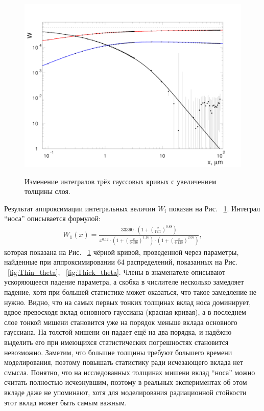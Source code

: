 \documentclass[a4paper,12pt]{article}
\begin{document}
\begin{large}
  \begin{figure}[ht]
    {
       \includegraphics[width=0.99\linewidth]{images/pars135}
    }
    \caption{Изменение интегралов трёх гауссовых кривых с увеличением толщины слоя.}
    \label{fig:Par1theta}
  \end{figure}

  Результат аппроксимации интегральных величин $W_i$ показан на Рис. ~\ref{fig:Par1theta}.
  Интеграл ``носа'' описывается формулой:
\begin{equation}
\label{MSApproximationW1}
\begin{aligned} 
W_1(x)= \frac{33390\cdot (1+\left(\frac{x}{17.1}\right)^{0.88})}{x^{0.12} \cdot \left(1+\left(\frac{x}{0.636}\right)^{1.16}\right) \cdot \left(1+\left(\frac{x}{6.128}\right)^{2.05}\right)},
\end{aligned}
\end{equation}
  которая показана на Рис. ~\ref{fig:Par1theta} чёрной кривой, проведенной через параметры, найденные при аппроксимировании 64 распределений, показанных на Рис. ~\ref{fig:Thin_theta}, ~\ref{fig:Thick_theta}.
  Члены в знаменателе описывают ускоряющееся падение параметра, а скобка в числителе несколько замедляет падение, хотя при большей статистике может оказаться, что такое замедление не нужно.
  Видно, что на самых первых тонких толщинах вклад носа доминирует, вдвое превосходя вклад основного гауссиана (красная кривая), а в последнем слое тонкой мишени становится уже на порядок меньше вклада основного гауссиана.
  На толстой мишени он падает ещё на два порядка, и надёжно выделить его при имеющихся статистических погрешностях становится невозможно.
  Заметим, что большие толщины требуют большего времени моделирования, поэтому повышать статистику ради исчезающего вклада нет смысла.
  Понятно, что на исследованных толщинах мишени вклад ``носа'' можно считать полностью исчезнувшим, поэтому в реальных экспериментах об этом вкладе даже не упоминают, хотя для моделирования радиационной стойкости этот вклад может быть самым важным.


\end{large}
\end{document}

